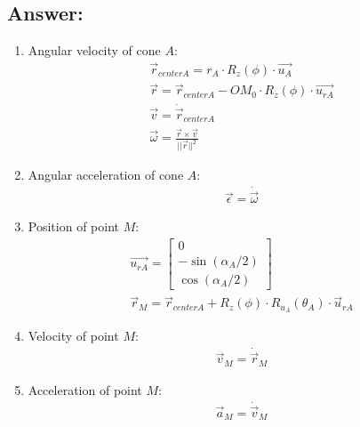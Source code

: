 \begin{answer}
    \subsection*{Answer:}
    \begin{enumerate}
        \item Angular velocity of cone $A$:
              \begin{align*}
                  \vec{r}_{centerA} = r_A \cdot  R_z(\phi) \cdot \vec{u_{A}}            \\
                  \vec{r} = \vec{r}_{centerA} - OM_0 \cdot R_z(\phi) \cdot \vec{u_{rA}} \\
                  \vec{v} = \dot{\vec{r}}_{centerA}                                     \\
                  \vec{\omega} = \frac{\vec{r} \times \vec{v}}{||\vec{r}||^2}
              \end{align*}
        \item Angular acceleration of cone $A$:
              \begin{align*}
                  \vec{\epsilon} = \dot{\vec{\omega}}
              \end{align*}
        \item Position of point $M$:
              \begin{align*}
                  \vec{u_{rA}} = \begin{bmatrix}
                      0                     \\
                      -\sin({\alpha_A / 2}) \\
                      \cos({\alpha_A / 2})
                  \end{bmatrix} \\
                  \vec{r}_{M} = \vec{r}_{centerA} + R_z(\phi) \cdot R_{u_A}(\theta_A) \cdot \vec{u}_{rA}
              \end{align*}
        \item Velocity of point $M$:
              \begin{align*}
                  \vec{v}_{M} = \dot{\vec{r}}_{M}
              \end{align*}
        \item Acceleration of point $M$:
              \begin{align*}
                  \vec{a}_{M} = \dot{\vec{v}}_{M}
              \end{align*}
    \end{enumerate}
\end{answer}
